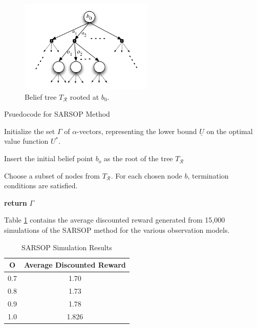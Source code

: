 \documentclass{article}
\begin{document}
\begin{figure}[h]
    \centering
    \includegraphics[width=2.5in]{sarsop.png}
    \caption{Belief tree $T_{\mathcal{R}}$ rooted at $b_{0}$.}
    \label{fig:sarsop tree}
\end{figure}

\begin{algorithm}
\caption{Psuedocode for SARSOP Method}\label{alg:sarsop}

Initialize the set $\Gamma$ of $\alpha$-vectors, representing the lower bound $\underline{U}$ on the optimal value function $U^*$.

Insert the initial belief point $b_{o}$ as the root of the tree $T_{\mathcal{R}}$
\begin{algorithmic}
\Repeat
    \State {}
    \State Choose a subset of nodes from $T_{\mathcal{R}}$.
    \State For each chosen node $b$, 
    \State {}
\Until termination conditions are satisfied.

\textbf{return} $\Gamma$
\end{algorithmic}
\end{algorithm}

Table \ref{tab:sarsop} contains the average discounted reward generated from 15,000 simulations of the SARSOP method for the various observation models.

\begin{table}[h]
\centering
\caption{SARSOP Simulation Results}
\label{tab:sarsop}
\begin{tabular}{|c|c|}
\hline
O & Average Discounted Reward  \\ \hline
0.7 & 1.70 \\ \hline
0.8 & 1.73 \\ \hline
0.9 & 1.78 \\ \hline
1.0 & 1.826 \\ \hline
\end{tabular}
\end{table}
\end{document}
